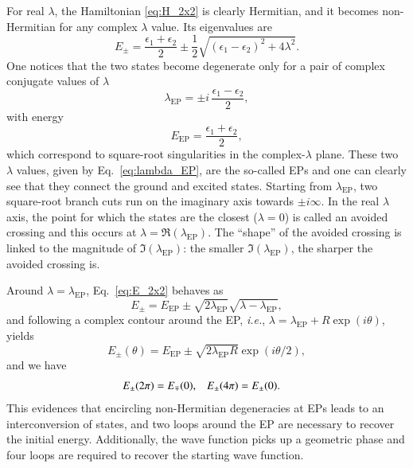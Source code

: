 \documentclass[aps,prb,reprint,noshowkeys,superscriptaddress]{revtex4-1}
\newcommand{\ie}{\textit{i.e.}}
\begin{document}
For real $\lambda$, the Hamiltonian \eqref{eq:H_2x2} is clearly Hermitian, and it becomes non-Hermitian for any complex $\lambda$ value.
Its eigenvalues are
\begin{equation}
\label{eq:E_2x2}
	E_{\pm} = \frac{\epsilon_1 + \epsilon_2}{2} \pm \frac{1}{2} \sqrt{(\epsilon_1 - \epsilon_2)^2 + 4\lambda^2}.
\end{equation}
One notices that the two states become degenerate only for a pair of complex conjugate values of $\lambda$
\begin{equation}
\label{eq:lambda_EP}
	\lambda_\text{EP} = \pm i\,\frac{\epsilon_1 - \epsilon_2}{2},
\end{equation}
with energy
\begin{equation}
\label{eq:E_EP}
	E_\text{EP} = \frac{\epsilon_1 + \epsilon_2}{2},
\end{equation}
which correspond to square-root singularities in the complex-$\lambda$ plane. %
These two $\lambda$ values, given by Eq.~\eqref{eq:lambda_EP}, are the so-called EPs and one can clearly see that they connect the ground and excited states.
Starting from $\lambda_\text{EP}$, two square-root branch cuts run on the imaginary axis towards $\pm i \infty$.
In the real $\lambda$ axis, the point for which the states are the closest ($\lambda = 0$) is called an avoided crossing and this occurs at $\lambda = \Re(\lambda_\text{EP})$.
The ``shape'' of the avoided crossing is linked to the magnitude of $\Im(\lambda_\text{EP})$: the smaller $\Im(\lambda_\text{EP})$, the sharper the avoided crossing is.

Around $\lambda = \lambda_\text{EP}$, Eq.~\eqref{eq:E_2x2} behaves as \cite{MoiseyevBook}
\begin{equation} %
        E_{\pm} = E_\text{EP} \pm \sqrt{2\lambda_\text{EP}} \sqrt{\lambda - \lambda_\text{EP}},
\end{equation}
and following a complex contour around the EP, \ie, $\lambda = \lambda_\text{EP} + R \exp(i\theta)$, yields
\begin{equation}
        E_{\pm}(\theta) = E_\text{EP} \pm \sqrt{2\lambda_\text{EP} R}  \exp(i\theta/2),
\end{equation}
and we have
\begin{align}
	E_{\pm}(2\pi) & = E_{\mp}(0),
	&
	E_{\pm}(4\pi) & = E_{\pm}(0). \notag
\end{align}
This evidences that encircling non-Hermitian degeneracies at EPs leads to an interconversion of states, and two loops around the EP are necessary to recover the initial energy.
Additionally, the wave function picks up a geometric phase and four loops are required to recover the starting wave function.
\cite{MoiseyevBook}
\end{document}
